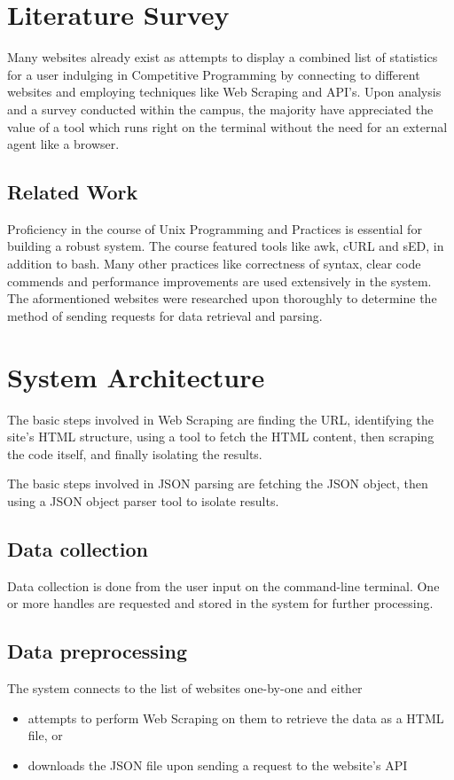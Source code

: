 \documentclass[12pt,a4paper]{report}
\begin{document}
\newpage
\chapter{Literature Survey}
Many websites already exist as attempts to display a combined list of statistics for a user indulging in Competitive Programming by connecting to different websites and employing techniques like Web Scraping and API's. Upon analysis and a survey conducted within the campus, the majority have appreciated the value of a tool which runs right on the terminal without the need for an external agent like a browser.

\section{Related Work}
Proficiency in the course of Unix Programming and Practices is essential for building a robust system. The course featured tools like awk, cURL and sED, in addition to bash. Many other practices like correctness of syntax, clear code commends and performance improvements are used extensively in the system. The aformentioned websites were researched upon thoroughly to determine the method of sending requests for data retrieval and parsing.

\newpage
\chapter{System Architecture}
The basic steps involved in Web Scraping are finding the URL, identifying the site's HTML structure, using a tool to fetch the HTML content, then scraping the code itself, and finally isolating the results.

The basic steps involved in JSON parsing are fetching the JSON object, then using a JSON object parser tool to isolate results.

\section{Data collection}
Data collection is done from the user input on the command-line terminal. One or more handles are requested and stored in the system for further processing.
\section{Data preprocessing}
The system connects to the list of websites one-by-one and either 
\begin{itemize}[itemsep=0em]
	\item attempts to perform Web Scraping on them to retrieve the data as a HTML file, or
	\item downloads the JSON file upon sending a request to the website's API
\end{itemize}
\end{document}
